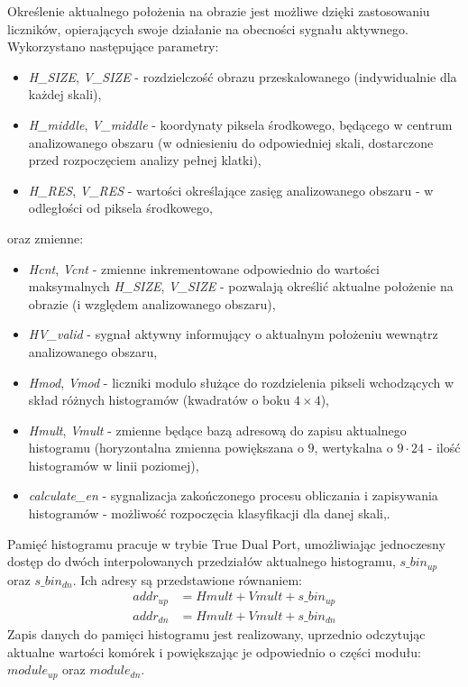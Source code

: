 Określenie aktualnego położenia na obrazie jest możliwe dzięki zastosowaniu liczników, opierających swoje działanie na obecności sygnału aktywnego. Wykorzystano następujące parametry:
\begin{itemize}
	\item \textit{H\_SIZE}, \textit{V\_SIZE} - rozdzielczość obrazu przeskalowanego (indywidualnie dla każdej skali),
	\item \textit{H\_middle}, \textit{V\_middle} - koordynaty piksela środkowego, będącego w centrum analizowanego obszaru (w odniesieniu do odpowiedniej skali, dostarczone przed rozpoczęciem analizy pełnej klatki),
	\item \textit{H\_RES}, \textit{V\_RES} - wartości określające zasięg analizowanego obszaru - w odległości od piksela środkowego,
\end{itemize}
oraz zmienne:
\begin{itemize}
	\item \textit{Hcnt}, \textit{Vcnt} - zmienne inkrementowane odpowiednio do wartości maksymalnych \textit{H\_SIZE}, \textit{V\_SIZE} - pozwalają określić aktualne położenie na obrazie (i względem analizowanego obszaru),
	\item \textit{HV\_valid} - sygnał aktywny informujący o aktualnym położeniu wewnątrz analizowanego obszaru,
	\item \textit{Hmod}, \textit{Vmod} - liczniki modulo służące do rozdzielenia pikseli wchodzących w skład różnych histogramów (kwadratów o boku $4\times 4$),
	\item \textit{Hmult}, \textit{Vmult} - zmienne będące bazą adresową do zapisu aktualnego histogramu (horyzontalna zmienna powiększana o $9$, wertykalna o $9\cdot24$ - ilość histogramów w linii poziomej),
	\item \textit{calculate\_en} - sygnalizacja zakończonego procesu obliczania i zapisywania histogramów - możliwość rozpoczęcia klasyfikacji dla danej skali,.
\end{itemize}

Pamięć histogramu pracuje w trybie True Dual Port, umożliwiając jednoczesny dostęp do dwóch interpolowanych przedziałów aktualnego histogramu, $s\_bin_{up}$ oraz $s\_bin_{dn}$. Ich adresy są przedstawione równaniem:
\begin{equation}
\label{eq:adressing_hist}
\left.\begin{aligned} 
addr_{up}&=Hmult+Vmult+s\_bin_{up} \\ 
addr_{dn}&=Hmult+Vmult+s\_bin_{dn}
\end{aligned}\right.
\end{equation}
Zapis danych do pamięci histogramu jest realizowany, uprzednio odczytując aktualne wartości komórek i powiększając je odpowiednio o części modułu: $module_{up}$ oraz $module_{dn}$.



